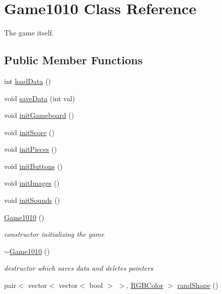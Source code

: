 \hypertarget{class_game1010}{}\section{Game1010 Class Reference}
\label{class_game1010}


The game itself.  


\subsection*{Public Member Functions}
\begin{DoxyCompactItemize}
\item 
int \mbox{\hyperlink{class_game1010_a3dbbf957de5309f1e7f3d6008f948176}{load\+Data}} ()
\item 
void \mbox{\hyperlink{class_game1010_a72900d1043c4d40f953c584a9d9cb6c8}{save\+Data}} (int val)
\item 
void \mbox{\hyperlink{class_game1010_aee1b07231495b0a78a77b6f04c07a848}{init\+Gameboard}} ()
\item 
void \mbox{\hyperlink{class_game1010_a90378af973c32816055e49bacc59a7de}{init\+Score}} ()
\item 
void \mbox{\hyperlink{class_game1010_a510e064a35ea16a5582ebe311a0131a7}{init\+Pieces}} ()
\item 
void \mbox{\hyperlink{class_game1010_a94c89079a87b30e7f4813d40283dd4ad}{init\+Buttons}} ()
\item 
void \mbox{\hyperlink{class_game1010_a3726442b01642369347347eff645830e}{init\+Images}} ()
\item 
void \mbox{\hyperlink{class_game1010_a995a153a4f9639b989d605078f6c1ac2}{init\+Sounds}} ()
\item 
\mbox{\hyperlink{class_game1010_a0a0688219844edbe8f4a44c11a13e32a}{Game1010}} ()
\begin{DoxyCompactList}\small\item\em constructor initializing the game \end{DoxyCompactList}\item 
\mbox{\hyperlink{class_game1010_abcdf29a3fb425ad389e247f241ee4ed5}{$\sim$\+Game1010}} ()
\begin{DoxyCompactList}\small\item\em destructor which saves data and deletes pointers \end{DoxyCompactList}\item 
pair$<$ vector$<$ vector$<$ bool $>$ $>$, \mbox{\hyperlink{class_r_g_b_color}{R\+G\+B\+Color}} $>$ \mbox{\hyperlink{class_game1010_a9b86f7bf4ad3af111014ad33a781ffe5}{rand\+Shape}} ()

\end{DoxyCompactItemize}

